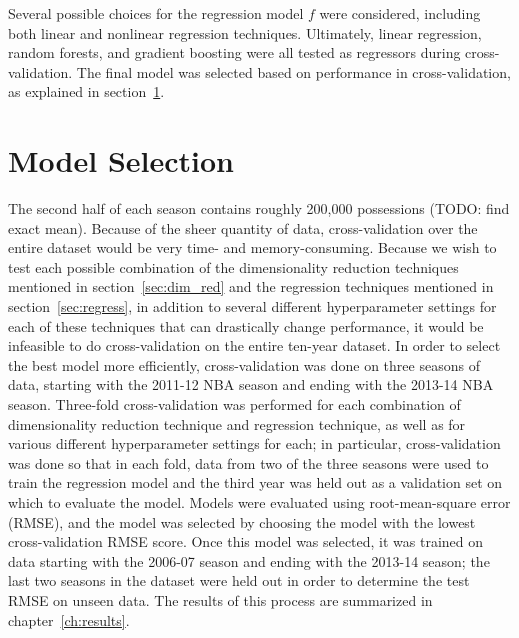 Several possible choices for the regression model $f$ were considered, including
both linear and nonlinear regression techniques. Ultimately, linear regression,
random forests, and gradient boosting were all tested as regressors during
cross-validation. The final model was selected based on performance in
cross-validation, as explained in section~\ref{sec:mod_sel}.

\section{Model Selection}
\label{sec:mod_sel}

The second half of each season contains roughly 200,000 possessions (TODO: find
exact mean). Because of the sheer quantity of data, cross-validation over the entire
dataset would be very time- and memory-consuming. Because we wish to test each
possible combination of the dimensionality reduction techniques mentioned in
section~\ref{sec:dim_red} and the regression techniques mentioned in
section~\ref{sec:regress}, in addition to several different hyperparameter settings
for each of these techniques that can drastically change performance, it would be
infeasible to do cross-validation on the entire ten-year dataset. In order to select
the best model more efficiently, cross-validation was done on three seasons of data,
starting with the 2011-12 NBA season and ending with the 2013-14 NBA season.
Three-fold cross-validation was performed for each combination of dimensionality
reduction technique and regression technique, as well as for various different
hyperparameter settings for each; in particular, cross-validation was done so that
in each fold, data from two of the three seasons were used to train the regression
model and the third year was held out as a validation set on which to evaluate the
model. Models were evaluated using root-mean-square error (RMSE), and the model was
selected by choosing the model with the lowest cross-validation RMSE score. Once
this model was selected, it was trained on data starting with the 2006-07 season and
ending with the 2013-14 season; the last two seasons in the dataset were held out in
order to determine the test RMSE on unseen data. The results of this process are
summarized in chapter~\ref{ch:results}.
